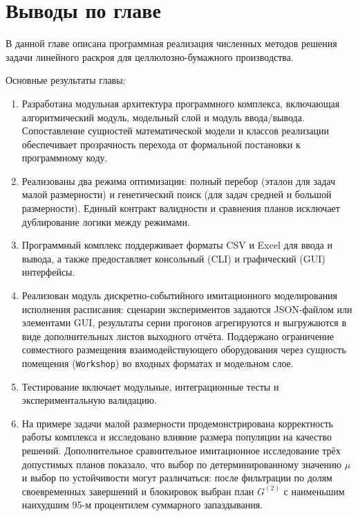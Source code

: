\section{Выводы по главе}\label{sec:software/conclusion}

В данной главе описана программная реализация численных методов решения задачи линейного раскроя для целлюлозно-бумажного производства.

Основные результаты главы:
\begin{enumerate}
    \item Разработана модульная архитектура программного комплекса, включающая алгоритмический модуль, модельный слой и модуль ввода/вывода.
    Сопоставление сущностей математической модели и классов реализации обеспечивает прозрачность перехода от формальной постановки к программному коду.
    \item Реализованы два режима оптимизации: полный перебор (эталон для задач малой размерности) и генетический поиск (для задач средней и большой размерности).
    Единый контракт валидности и сравнения планов исключает дублирование логики между режимами.
    \item Программный комплекс поддерживает форматы CSV и Excel для ввода и вывода, а также предоставляет консольный (CLI) и графический (GUI) интерфейсы.
    \item Реализован модуль дискретно-событийного имитационного моделирования исполнения расписания: сценарии экспериментов задаются JSON-файлом или элементами GUI, результаты серии прогонов агрегируются и выгружаются в виде дополнительных листов выходного отчёта. Поддержано ограничение совместного размещения взаимодействующего оборудования через сущность помещения (\texttt{Workshop}) во входных форматах и модельном слое.
    \item Тестирование включает модульные, интеграционные тесты и экспериментальную валидацию.
    \item На примере задачи малой размерности продемонстрирована корректность работы комплекса и исследовано влияние размера популяции на качество решений.
    Дополнительное сравнительное имитационное исследование трёх допустимых планов показало, что выбор по детерминированному значению $\mu$ и выбор по устойчивости могут различаться: после фильтрации по долям своевременных завершений и блокировок выбран план $G^{(2)}$ с наименьшим наихудшим 95-м процентилем суммарного запаздывания.
\end{enumerate}

